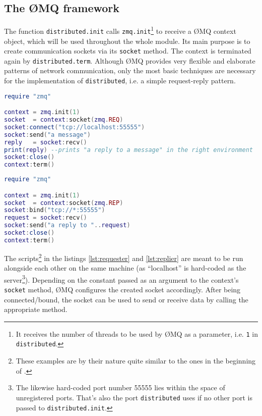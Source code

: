 \subsection{The \O MQ framework}
\label{sec:messages:zeromq}

The function \texttt{distributed.init} calls \texttt{zmq.init}\footnote{It receives the number of threads to be used by \O MQ as a parameter, i.e. \texttt{1} in \texttt{distributed}.} to receive a \O MQ context object, which will be used throughout the whole module. Its main purpose is to create communication sockets via its \texttt{socket} method. The context is terminated again by \texttt{distributed.term}. Although \O MQ provides very flexible and elaborate patterns of network communication, only the most basic techniques are necessary for the implementation of \texttt{distributed}, i.e. a simple request-reply pattern.

\begin{lstlisting}[language=lua, caption={Example of the \emph{request} side of a communication via \O MQ}, label=lst:requester, name=lst:requester]
require "zmq"

context = zmq.init(1)
socket  = context:socket(zmq.REQ)
socket:connect("tcp://localhost:55555")
socket:send("a message")
reply   = socket:recv()
print(reply) --prints "a reply to a message" in the right environment
socket:close()
context:term()
\end{lstlisting}

\begin{lstlisting}[language=lua, caption={Example of the \emph{reply} side of a communication via \O MQ}, label=lst:replier, name=lst:repler]
require "zmq"

context = zmq.init(1)
socket  = context:socket(zmq.REP)
socket:bind("tcp://*:55555")
request = socket:recv()
socket:send("a reply to "..request)
socket:close()
context:term()
\end{lstlisting}

The scripts\footnote{These examples are by their nature quite similar to the ones in the beginning of \cite{ZeroMQ}.} in the listings \ref{lst:requester} and \ref{lst:replier} are meant to be run alongside each other on the same machine (as ``localhost'' is hard-coded as the server\footnote{The likewise hard-coded port number 55555 lies within the space of unregistered ports. That's also the port \texttt{distributed} uses if no other port is passed to \texttt{distributed.init}.}). Depending on the constant passed as an argument to the context's \texttt{socket} method, \O MQ configures the created socket accordingly. After being connected/bound, the socket can be used to send or receive data by calling the appropriate method.

